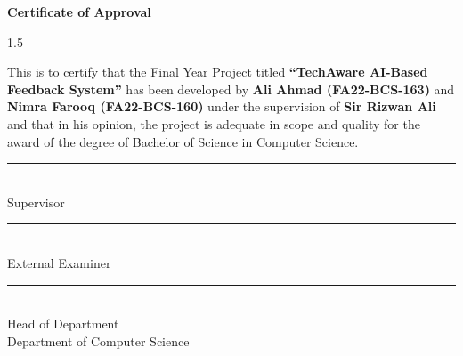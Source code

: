 

\newpage
\thispagestyle{empty}

\begin{center}
\textbf{\LARGE Certificate of Approval}
\end{center}

\vspace{1.5cm}

\begin{spacing}{1.5}

This is to certify that the Final Year Project titled 
\textbf{``TechAware AI-Based Feedback System''} 
has been developed by \textbf{Ali Ahmad (FA22-BCS-163)} and \textbf{Nimra Farooq (FA22-BCS-160)} under the supervision of \textbf{Sir Rizwan Ali} and that in his opinion, the project is adequate in scope and quality for the award of the degree of Bachelor of Science in Computer Science.

\end{spacing}

\vspace{2.5cm}
\noindent\rule{6cm}{0.4pt}  
\\ 
Supervisor

\vspace{2.5cm}
\noindent\rule{6cm}{0.4pt}  
\\ 
External Examiner

\vspace{2.5cm}

\noindent\rule{6cm}{0.4pt}  
\\ 
Head of Department  
\\ 
Department of Computer Science

\newpage
